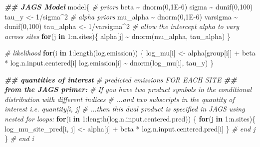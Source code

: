\documentclass[
]{article}
\newenvironment{Shaded}{\begin{snugshade}}{\end{snugshade}}
\newcommand{\CommentTok}[1]{\textcolor[rgb]{0.56,0.35,0.01}{\textit{#1}}}
\newcommand{\ControlFlowTok}[1]{\textcolor[rgb]{0.13,0.29,0.53}{\textbf{#1}}}
\newcommand{\DecValTok}[1]{\textcolor[rgb]{0.00,0.00,0.81}{#1}}
\newcommand{\DocumentationTok}[1]{\textcolor[rgb]{0.56,0.35,0.01}{\textbf{\textit{#1}}}}
\newcommand{\FloatTok}[1]{\textcolor[rgb]{0.00,0.00,0.81}{#1}}
\newcommand{\FunctionTok}[1]{\textcolor[rgb]{0.00,0.00,0.00}{#1}}
\newcommand{\NormalTok}[1]{#1}
\newcommand{\OtherTok}[1]{\textcolor[rgb]{0.56,0.35,0.01}{#1}}
\newcommand{\SpecialCharTok}[1]{\textcolor[rgb]{0.00,0.00,0.00}{#1}}
\begin{document}
\begin{Shaded}
\begin{Highlighting}[]
\DocumentationTok{\#\# JAGS Model}
\NormalTok{model\{}
  \CommentTok{\# priors}
\NormalTok{  beta }\SpecialCharTok{\textasciitilde{}} \FunctionTok{dnorm}\NormalTok{(}\DecValTok{0}\NormalTok{,}\FloatTok{1E{-}6}\NormalTok{)}
\NormalTok{  sigma }\SpecialCharTok{\textasciitilde{}} \FunctionTok{dunif}\NormalTok{(}\DecValTok{0}\NormalTok{,}\DecValTok{100}\NormalTok{)}
\NormalTok{  tau\_y }\OtherTok{\textless{}{-}} \DecValTok{1}\SpecialCharTok{/}\NormalTok{sigma}\SpecialCharTok{\^{}}\DecValTok{2}
  \CommentTok{\# alpha priors}
\NormalTok{  mu\_alpha }\SpecialCharTok{\textasciitilde{}} \FunctionTok{dnorm}\NormalTok{(}\DecValTok{0}\NormalTok{,}\FloatTok{1E{-}6}\NormalTok{)}
\NormalTok{  varsigma }\SpecialCharTok{\textasciitilde{}} \FunctionTok{dunif}\NormalTok{(}\DecValTok{0}\NormalTok{,}\DecValTok{100}\NormalTok{)}
\NormalTok{  tau\_alpha }\OtherTok{\textless{}{-}} \DecValTok{1}\SpecialCharTok{/}\NormalTok{varsigma}\SpecialCharTok{\^{}}\DecValTok{2}
  \CommentTok{\# allow the intercept alpha to vary across sites}
    \ControlFlowTok{for}\NormalTok{(j }\ControlFlowTok{in} \DecValTok{1}\SpecialCharTok{:}\NormalTok{n.sites)\{}
\NormalTok{      alpha[j] }\SpecialCharTok{\textasciitilde{}} \FunctionTok{dnorm}\NormalTok{(mu\_alpha, tau\_alpha)}
\NormalTok{    \}}

  \CommentTok{\# likelihood}
  \ControlFlowTok{for}\NormalTok{(i }\ControlFlowTok{in} \DecValTok{1}\SpecialCharTok{:}\FunctionTok{length}\NormalTok{(log.emission)) \{}
\NormalTok{    log\_mu[i] }\OtherTok{\textless{}{-}}\NormalTok{ alpha[group[i]] }\SpecialCharTok{+}\NormalTok{ beta }\SpecialCharTok{*}\NormalTok{ log.n.input.centered[i]}
\NormalTok{    log.emission[i] }\SpecialCharTok{\textasciitilde{}} \FunctionTok{dnorm}\NormalTok{(log\_mu[i], tau\_y)}
\NormalTok{  \}}

  \DocumentationTok{\#\# quantities of interest}
    \CommentTok{\# predicted emissions FOR EACH SITE}
      \DocumentationTok{\#\# from the JAGS primer: }
        \CommentTok{\# If you have two product symbols in the conditional distribution with different indices}
          \CommentTok{\# ...and two subscripts in the quantity of interest i.e. quantity[i, j] }
          \CommentTok{\# ...then this dual product is specified in JAGS using nested for loops:}
      \ControlFlowTok{for}\NormalTok{(i }\ControlFlowTok{in} \DecValTok{1}\SpecialCharTok{:}\FunctionTok{length}\NormalTok{(log.n.input.centered.pred)) \{}
        \ControlFlowTok{for}\NormalTok{(j }\ControlFlowTok{in} \DecValTok{1}\SpecialCharTok{:}\NormalTok{n.sites)\{}
\NormalTok{          log\_mu\_site\_pred[i, j] }\OtherTok{\textless{}{-}}\NormalTok{ alpha[j] }\SpecialCharTok{+}\NormalTok{ beta }\SpecialCharTok{*}\NormalTok{ log.n.input.centered.pred[i]}
\NormalTok{        \} }\CommentTok{\# end j}
\NormalTok{      \} }\CommentTok{\# end i}
    

\end{Highlighting}
\end{Shaded}
\end{document}
